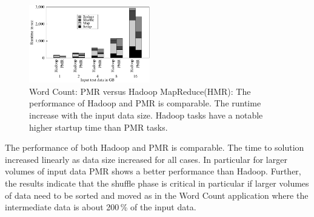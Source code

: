 \documentclass{acm_proc_article-sp}
\newcommand{\pnote}[1]{ {\textcolor{magenta} { ***pradeep: #1 }}}
\newcommand{\pnote}[1]{}
\begin{document}
\begin{figure}[ht]
	\centering
		\includegraphics[width=0.47\textwidth]{figures/wc_pmr_hmr.pdf}
\caption{Word Count: PMR versus Hadoop MapReduce(HMR): The performance of Hadoop and PMR is 
comparable. The runtime increase with the input data size. Hadoop tasks have a 
notable higher startup time than PMR tasks.} 	
\label{fig:figures_wc_pmr_hmr}
\end{figure}		
	
The performance of both Hadoop and PMR is comparable. The time to solution 
increased linearly as data size increased for all cases. In particular for 
larger volumes of input data PMR shows a better performance than Hadoop. 
Further, the results indicate that the shuffle phase is critical in particular 
if larger volumes of data need to be sorted and moved as in the Word Count 
application where the intermediate data is about 200\,\% of the input data.



\end{document}
